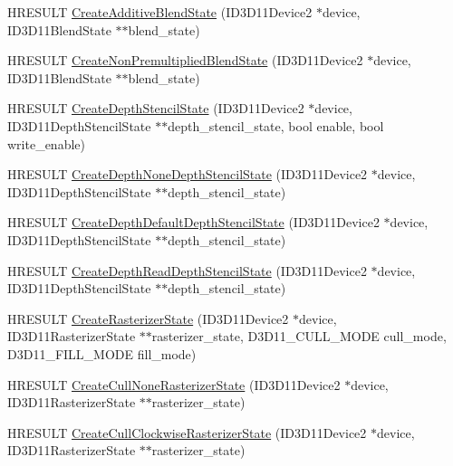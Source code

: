 \begin{DoxyCompactItemize}
\item 
H\+R\+E\+S\+U\+LT \hyperlink{namespacemage_a5c813464cd190784dec2d505d3254917}{Create\+Additive\+Blend\+State} (I\+D3\+D11\+Device2 $\ast$device, I\+D3\+D11\+Blend\+State $\ast$$\ast$blend\+\_\+state)
\item 
H\+R\+E\+S\+U\+LT \hyperlink{namespacemage_a6f4e37e4b8092acec9dad9a8b24ebb07}{Create\+Non\+Premultiplied\+Blend\+State} (I\+D3\+D11\+Device2 $\ast$device, I\+D3\+D11\+Blend\+State $\ast$$\ast$blend\+\_\+state)
\item 
H\+R\+E\+S\+U\+LT \hyperlink{namespacemage_a8821b7d9587082504cb1f4d04e53ff05}{Create\+Depth\+Stencil\+State} (I\+D3\+D11\+Device2 $\ast$device, I\+D3\+D11\+Depth\+Stencil\+State $\ast$$\ast$depth\+\_\+stencil\+\_\+state, bool enable, bool write\+\_\+enable)
\item 
H\+R\+E\+S\+U\+LT \hyperlink{namespacemage_ab1edddad5787ae095bc03f1cf5c54564}{Create\+Depth\+None\+Depth\+Stencil\+State} (I\+D3\+D11\+Device2 $\ast$device, I\+D3\+D11\+Depth\+Stencil\+State $\ast$$\ast$depth\+\_\+stencil\+\_\+state)
\item 
H\+R\+E\+S\+U\+LT \hyperlink{namespacemage_adc620b251acd7cb9c4b5f905607ceee5}{Create\+Depth\+Default\+Depth\+Stencil\+State} (I\+D3\+D11\+Device2 $\ast$device, I\+D3\+D11\+Depth\+Stencil\+State $\ast$$\ast$depth\+\_\+stencil\+\_\+state)
\item 
H\+R\+E\+S\+U\+LT \hyperlink{namespacemage_a56b331ac7866106016040e4ebce50790}{Create\+Depth\+Read\+Depth\+Stencil\+State} (I\+D3\+D11\+Device2 $\ast$device, I\+D3\+D11\+Depth\+Stencil\+State $\ast$$\ast$depth\+\_\+stencil\+\_\+state)
\item 
H\+R\+E\+S\+U\+LT \hyperlink{namespacemage_a801f8c5a484129ae6717733de626b625}{Create\+Rasterizer\+State} (I\+D3\+D11\+Device2 $\ast$device, I\+D3\+D11\+Rasterizer\+State $\ast$$\ast$rasterizer\+\_\+state, D3\+D11\+\_\+\+C\+U\+L\+L\+\_\+\+M\+O\+DE cull\+\_\+mode, D3\+D11\+\_\+\+F\+I\+L\+L\+\_\+\+M\+O\+DE fill\+\_\+mode)
\item 
H\+R\+E\+S\+U\+LT \hyperlink{namespacemage_a7583853c115c9c5cecb583fa61157c25}{Create\+Cull\+None\+Rasterizer\+State} (I\+D3\+D11\+Device2 $\ast$device, I\+D3\+D11\+Rasterizer\+State $\ast$$\ast$rasterizer\+\_\+state)
\item 
H\+R\+E\+S\+U\+LT \hyperlink{namespacemage_a033a0ae29692c9fc223e532b7487aed5}{Create\+Cull\+Clockwise\+Rasterizer\+State} (I\+D3\+D11\+Device2 $\ast$device, I\+D3\+D11\+Rasterizer\+State $\ast$$\ast$rasterizer\+\_\+state)
\item 
$$
\end{DoxyCompactItemize}
